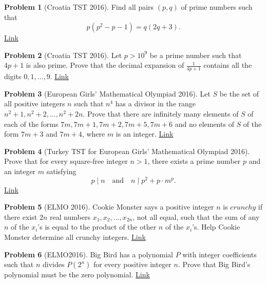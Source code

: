 \documentclass[]{article}
\theoremstyle{definition}
\newtheorem{problem}{Problem}
\begin{document}
\begin{problem}[Croatia TST ‌2016]
	Find all pairs $(p,q)$ of prime numbers such that
	$$ p(p^2 - p - 1) = q(2q + 3) .$$
	\flushright \href{http://artofproblemsolving.com/community/c6h1234390p6260615}{Link}
\end{problem}




\begin{problem}[Croatia TST ‌2016]
	Let $p > 10^9$ be a prime number such that $4p + 1$ is also prime.
	Prove that the decimal expansion of $\frac{1}{4p+1}$ contains all the digits $0,1, \ldots, 9$. \hfill \href{http://artofproblemsolving.com/community/c6h1233196p6246286}{Link}
\end{problem}



\begin{problem}[European Girls' Mathematical Olympiad 2016]
	Let $S$ be the set of all positive integers $n$ such that $n^4$ has a divisor in the range $n^2 +1, n^2 + 2,...,n^2 + 2n$. Prove that there are infinitely many elements of $S$ of each of the forms $7m, 7m+1, 7m+2, 7m+5, 7m+6$ and no elements of $S$ of the form $7m+3$ and $7m+4$, where $m$ is an integer. \hfill \href{http://artofproblemsolving.com/community/c6h1227241p6177824}{Link}
\end{problem}



\begin{problem}[Turkey TST for European Girls' Mathematical Olympiad 2016]
	Prove that for every square-free integer $n>1$, there exists a prime number $p$ and an integer $m$ satisfying
	\[ p \mid n \quad \text{and} \quad n \mid p^2+p\cdot m^p. \]
	\flushright \href{http://artofproblemsolving.com/community/c6h1248658p6420003}{Link}
\end{problem}



\begin{problem}[ELMO 2016]
	Cookie Monster says a positive integer $n$ is $crunchy$ if there exist $2n$ real numbers $x_1,x_2,\ldots,x_{2n}$, not all equal, such that the sum of any $n$ of the $x_i$'s is equal to the product of the other $n$ of the $x_i$'s. Help Cookie Monster determine all crunchy integers. \hfill \href{http://artofproblemsolving.com/community/c6h1262189p6556895}{Link}
\end{problem}



\begin{problem}[ELMO‌2016]
	Big Bird has a polynomial $P$ with integer coefficients such that $n$ divides $P(2^n)$ for every positive integer $n$. Prove that Big Bird's polynomial must be the zero polynomial. \hfill \href{http://artofproblemsolving.com/community/c6h1262192p6556902}{Link}
\end{problem}
\end{document}
